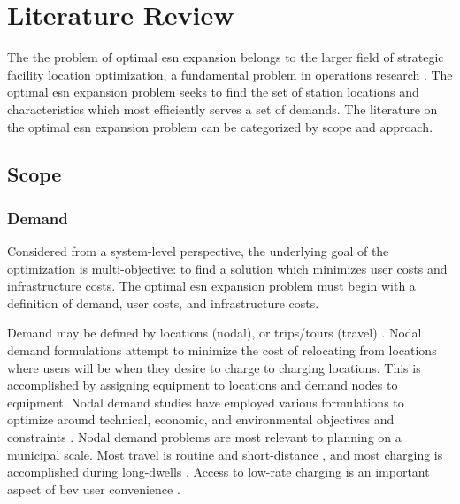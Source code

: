 \section{Literature Review}

The the problem of optimal \gls{esn} expansion belongs to the larger field of strategic facility location optimization, a fundamental problem in operations research \citep{Owen_1998}. The optimal \gls{esn} expansion problem seeks to find the set of station locations and characteristics which most efficiently serves a set of demands. The literature on the optimal \gls{esn} expansion problem can be categorized by scope and approach.

\subsection{Scope}

\subsubsection{Demand}

Considered from a system-level perspective, the underlying goal of the optimization is multi-objective: to find a solution which minimizes user costs and infrastructure costs. The optimal \gls{esn} expansion problem must begin with a definition of demand, user costs, and infrastructure costs.

Demand may be defined by locations (nodal), or trips/tours (travel) \citep{Metais_2022_rser}. Nodal demand formulations attempt to minimize the cost of relocating from locations where users will be when they desire to charge to charging locations. This is accomplished by assigning equipment to locations and demand nodes to equipment. Nodal demand studies have employed various formulations to optimize around technical, economic, and environmental objectives and constraints \citep{Zhu_2018_jssse, Yi_2019_e, Xiao_2020_jes, Ma_Xie_2021_trd, Kuby_2023_he, Faustino_2023_e, Gupta_2023_jes, Liu_2023_ijst, Weekx_2024_trr, Yuvaraj_2024_ia, Davatgari_2024_ejor, Tungom_2024_esa, Vijay_2024_es, Wu_2024_trd}. Nodal demand problems are most relevant to planning on a municipal scale. Most travel is routine and short-distance \citep{NHTS_2017, NHTS_2022}, and most charging is accomplished during long-dwells \citep{Hardman_2018}. Access to low-rate charging is an important aspect of \gls{bev} user convenience \citep{Rabinowitz_2023_ia}.

